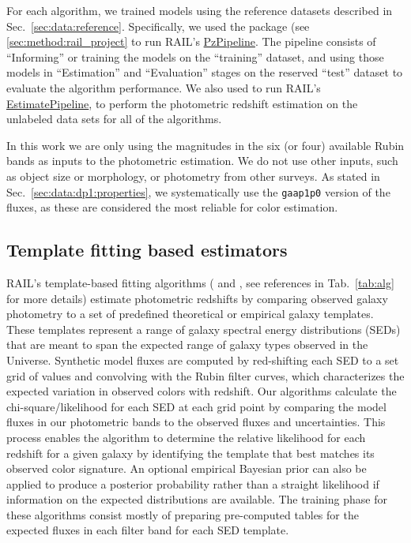 For each algorithm, we trained \photoz models using the reference datasets described in Sec.~\ref{sec:data:reference}.   Specifically, we used the  package (see \ref{sec:method:rail_project} to run RAIL’s \href{https://github.com/LSSTDESC/rail_pipelines/blob/main/src/rail/pipelines/estimation/pz_all.py}{PzPipeline}.  The pipeline consists of ``Informing'' or training the models on the ``training'' dataset, and using those models in ``Estimation'' and ``Evaluation'' stages on the reserved ``test'' dataset to evaluate the algorithm performance.  We also used  to run RAIL’s  \href{https://github.com/LSSTDESC/rail_pipelines/blob/main/src/rail/pipelines/estimation/estimate_all.py}{EstimatePipeline}, to perform the photometric redshift estimation on the unlabeled data sets for all of the algorithms.

In this work we are only using the magnitudes in the six (or four) available Rubin bands as inputs to the photometric estimation.  We do not use other inputs, such as object size or morphology, or photometry from other surveys.   As stated in
Sec.~\ref{sec:data:dp1:properties}, we systematically use the \texttt{gaap1p0} version of the fluxes, as these are considered the most reliable for color estimation.


\subsection{Template fitting based estimators}
\label{sec:method:template}

RAIL’s template-based fitting algorithms ( and , see references in Tab.~\ref{tab:alg} for more details) estimate photometric redshifts by comparing observed galaxy photometry to a set of predefined theoretical or empirical galaxy templates.  These templates represent a range of galaxy spectral energy distributions (SEDs) that are meant to span the expected range of galaxy types observed in the Universe.  Synthetic model fluxes are computed by red-shifting each SED to a set grid of values and convolving with the Rubin filter curves,  which characterizes the expected variation in observed colors with redshift.  Our algorithms calculate the chi-square/likelihood for each SED at each grid point by comparing the model fluxes in our photometric bands to the observed fluxes and uncertainties.  This process enables the algorithm to determine the relative likelihood for each redshift for a given galaxy by identifying the template that best matches its observed color signature.  An optional empirical Bayesian prior can also be applied to produce a posterior probability rather than a straight likelihood if information on the expected distributions are available.  The training phase for these algorithms consist mostly of preparing pre-computed tables for the expected fluxes in each filter band for each SED template. 

